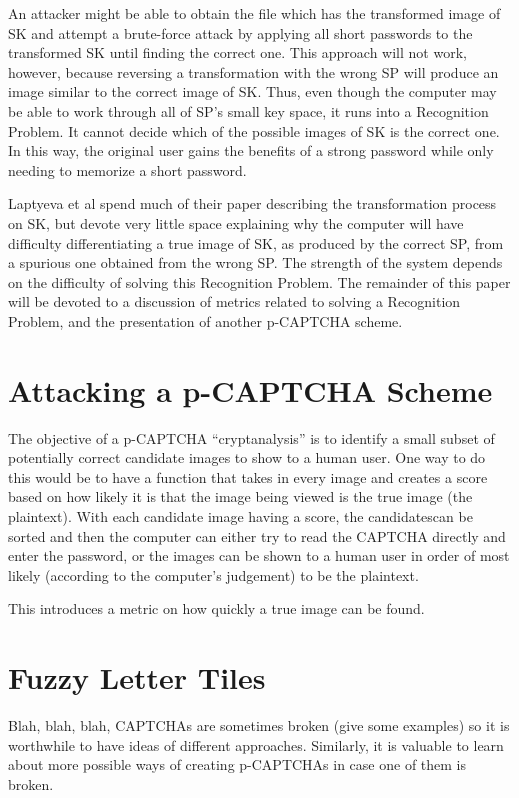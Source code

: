 \documentclass[12pt]{article}
\begin{document}
	An attacker might be able to obtain the file which has the transformed image of SK and attempt a brute-force attack by applying all short passwords to the transformed SK until finding the correct one. This approach will not work, however, because reversing a transformation with the wrong SP will produce an image similar to the correct image of SK. Thus, even though the computer may be able to work through all of SP's small key space, it runs into a Recognition Problem. It cannot decide which of the possible images of SK is the correct one. In this way, the original user gains the benefits of a strong password while only needing to memorize a short password.

	Laptyeva et al spend much of their paper describing the transformation process on SK, but devote very little space explaining why the computer will have difficulty differentiating a true image of SK, as produced by the correct SP, from a spurious one obtained from the wrong SP. The strength of the system depends on the difficulty of solving this Recognition Problem. The remainder of this paper will be devoted to a discussion of metrics related to solving a Recognition Problem, and the presentation of another p-CAPTCHA scheme.

\section*{Attacking a p-CAPTCHA Scheme}
	The objective of a p-CAPTCHA “cryptanalysis” is to identify a small subset of potentially correct candidate images to show to a human user. One way to do this would be to have a function that takes in every image and creates a score based on how likely it is that the image being viewed is the true image (the plaintext). With each candidate image having a score, the candidatescan be sorted and then the computer can either try to read the CAPTCHA directly and enter the password, or the images can be shown to a human user in order of  most likely (according to the computer's judgement) to be the plaintext.

    This introduces a metric on how quickly a true image can be found.

\section*{Fuzzy Letter Tiles}

Blah, blah, blah, CAPTCHAs are sometimes broken (give some examples) so it is worthwhile to have ideas of different approaches. Similarly, it is valuable to learn about more possible ways of creating p-CAPTCHAs in case one of them is broken.
\end{document}
